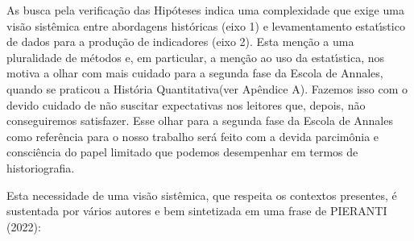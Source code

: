 \documentclass[
12pt,		%
openright,	%
twoside,  %
a4paper,			%
chapter=TITLE,		%
english,			%
french,				%
spanish,			%
brazil				%
]{USPSC-classe/USPSC}
\begin{document}
\noindent\begin{center}\mbox{\centering{}}\end{center}


As busca pela verifica\c{c}\~ao das Hip\'oteses indica uma complexidade que exige uma vis\~ao sist\^emica entre abordagens hist\'oricas (eixo 1) e levamentamento estat\'{\i}stico de dados para a produ\c{c}\~ao de indicadores (eixo 2). Esta men\c{c}\~ao a uma pluralidade de m\'etodos e, em particular, a men\c{c}\~ao ao uso da estat\'{\i}stica, nos motiva a olhar com mais cuidado para a segunda fase da Escola de Annales, quando se praticou a \textquotedbl Hist\'oria Quantitativa\textquotedbl  (ver Ap\^endice A). Fazemos isso com o devido cuidado de n\~ao suscitar expectativas nos leitores que, depois, n\~ao conseguiremos satisfazer. Esse olhar para a segunda fase da Escola de Annales como refer\^encia para o nosso trabalho ser\'a feito com a devida parcim\^onia e consci\^encia do papel limitado que podemos desempenhar em termos de historiografia.

















Esta necessidade de uma vis\~ao sist\^emica, que respeita os contextos presentes, \'e sustentada por v\'arios autores e bem sintetizada em uma frase de PIERANTI (2022):
\end{document}
